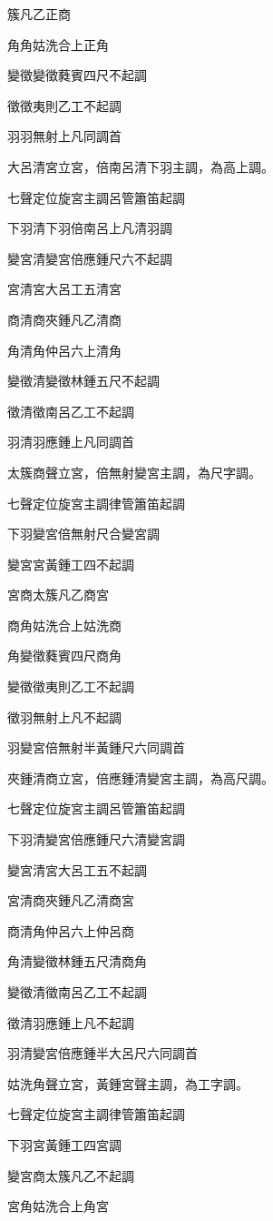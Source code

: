 \begin{pinyinscope}
簇凡乙正商

角角姑洗合上正角

變徵變徵蕤賓四尺不起調

徵徵夷則乙工不起調

羽羽無射上凡同調首

大呂清宮立宮，倍南呂清下羽主調，為高上調。

七聲定位旋宮主調呂管簫笛起調

下羽清下羽倍南呂上凡清羽調

變宮清變宮倍應鍾尺六不起調

宮清宮大呂工五清宮

商清商夾鍾凡乙清商

角清角仲呂六上清角

變徵清變徵林鍾五尺不起調

徵清徵南呂乙工不起調

羽清羽應鍾上凡同調首

太簇商聲立宮，倍無射變宮主調，為尺字調。

七聲定位旋宮主調律管簫笛起調

下羽變宮倍無射尺合變宮調

變宮宮黃鍾工四不起調

宮商太簇凡乙商宮

商角姑洗合上姑洗商

角變徵蕤賓四尺商角

變徵徵夷則乙工不起調

徵羽無射上凡不起調

羽變宮倍無射半黃鍾尺六同調首

夾鍾清商立宮，倍應鍾清變宮主調，為高尺調。

七聲定位旋宮主調呂管簫笛起調

下羽清變宮倍應鍾尺六清變宮調

變宮清宮大呂工五不起調

宮清商夾鍾凡乙清商宮

商清角仲呂六上仲呂商

角清變徵林鍾五尺清商角

變徵清徵南呂乙工不起調

徵清羽應鍾上凡不起調

羽清變宮倍應鍾半大呂尺六同調首

姑洗角聲立宮，黃鍾宮聲主調，為工字調。

七聲定位旋宮主調律管簫笛起調

下羽宮黃鍾工四宮調

變宮商太簇凡乙不起調

宮角姑洗合上角宮


\end{pinyinscope}
